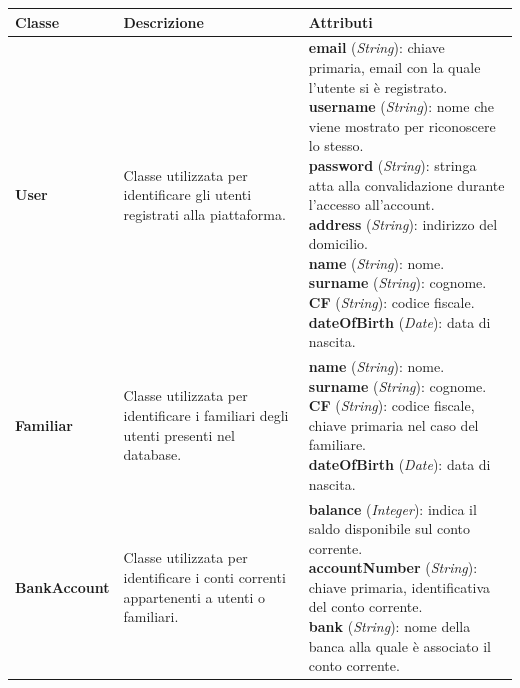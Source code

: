 \begin{longtable}{m{2.7cm}|m{4cm}|m{7cm}}

    \rowcolor{black!10}
    \textbf{Classe} & \textbf{Descrizione} & \textbf{Attributi} \\ \hline
    \endhead

    \textbf{User} & \raggedright Classe utilizzata per identificare gli utenti registrati alla piattaforma. &
    \parbox{7cm}{
        \textbf{email} (\textit{String}): chiave primaria, email con la quale l'utente si è registrato. \\ 
        \textbf{username} (\textit{String}): nome che viene mostrato per riconoscere lo stesso. \\
        \textbf{password} (\textit{String}): stringa atta alla convalidazione durante l'accesso all'account. \\
        \textbf{address} (\textit{String}): indirizzo del domicilio. \\
        \textbf{name} (\textit{String}): nome. \\
        \textbf{surname} (\textit{String}): cognome. \\
        \textbf{CF} (\textit{String}): codice fiscale. \\
        \textbf{dateOfBirth} (\textit{Date}): data di nascita.
    } \\ \hline

    \textbf{Familiar} & \raggedright Classe utilizzata per identificare i familiari degli utenti presenti nel database. &
    \parbox{7cm}{
        \textbf{name} (\textit{String}): nome. \\
        \textbf{surname} (\textit{String}): cognome. \\
        \textbf{CF} (\textit{String}): codice fiscale, chiave primaria nel caso del familiare. \\
        \textbf{dateOfBirth} (\textit{Date}): data di nascita.
    } \\ \hline

    \textbf{BankAccount} & \raggedright Classe utilizzata per identificare i conti correnti appartenenti a utenti o familiari. &
    \parbox{7cm}{
        \textbf{balance} (\textit{Integer}): indica il saldo disponibile sul conto corrente. \\
        \textbf{accountNumber} (\textit{String}): chiave primaria, identificativa del conto corrente. \\
        \textbf{bank} (\textit{String}): nome della banca alla quale è associato il conto corrente.
    } \\ \hline


\end{longtable}
